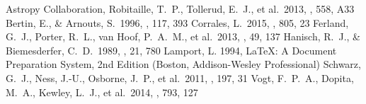 \documentclass[twocolumn]{aastex62}
\newcommand\aastex{AAS\TeX}
\begin{document}



\begin{thebibliography}{}

 Astropy Collaboration, Robitaille, T.~P., Tollerud, E.~J., et al.\ 2013, \aap, 558, A33 
 Bertin, E., \& Arnouts, S.\ 1996, \aaps, 117, 393 
 Corrales, L.\ 2015, \apj, 805, 23
 Ferland, G.~J., Porter, R.~L., van Hoof, P.~A.~M., et al.\ 2013, \rmxaa, 49, 137
 Hanisch, R.~J., \& Biemesderfer, C.~D.\ 1989, \baas, 21, 780 
 Lamport, L. 1994, LaTeX: A Document Preparation System, 2nd Edition (Boston, Addison-Wesley Professional)
 Schwarz, G.~J., Ness, J.-U., Osborne, J.~P., et al.\ 2011, \apjs, 197, 31  
 Vogt, F.~P.~A., Dopita, M.~A., Kewley, L.~J., et al.\ 2014, \apj, 793, 127  
\end{thebibliography}
\newpage
\end{document}
